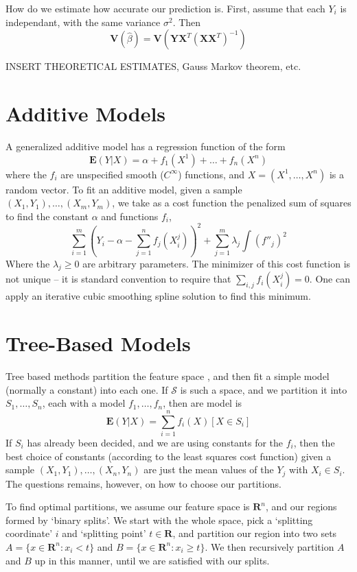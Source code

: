 How do we estimate how accurate our prediction is. First, assume that each $Y_i$ is independant, with the same variance $\sigma^2$. Then
%
\[ \mathbf{V}(\hat{\beta}) = \mathbf{V}(\mathbf{Y} \mathbf{X}^T (\mathbf{X} \mathbf{X}^T)^{-1}) \]

INSERT THEORETICAL ESTIMATES, Gauss Markov theorem, etc.





\section{Additive Models}

A generalized additive model has a regression function of the form
%
\[ \mathbf{E}(Y|X) = \alpha + f_1(X^1) + \dots + f_n(X^n) \]
%
where the $f_i$ are unspecified smooth ($C^\infty$) functions, and $X = (X^1, \dots, X^n)$ is a random vector. To fit an additive model, given a sample $(X_1, Y_1), \dots, (X_m, Y_m)$, we take as a cost function the penalized sum of squares to find the constant $\alpha$ and functions $f_i$,
%
\[ \sum_{i = 1}^m \left( Y_i - \alpha - \sum_{j = 1}^n f_j(X_i^j) \right)^2 + \sum_{j = 1}^m \lambda_j \int (f''_j)^2 \]
%
Where the $\lambda_j \geq 0$ are arbitrary parameters. The minimizer of this cost function is not unique -- it is standard convention to require that $\sum_{i,j} f_i(X_i^j) = 0$. One can apply an iterative cubic smoothing spline solution to find this minimum.

\section{Tree-Based Models}

Tree based methods partition the feature space , and then fit a simple model (normally a constant) into each one. If $\mathcal{S}$ is such a space, and we partition it into $S_1, \dots, S_n$, each with a model $f_1, \dots, f_n$, then are model is
%
\[ \mathbf{E}(Y|X) = \sum_{i = 1}^n f_i(X) [X \in S_i] \]
%
If $S_i$ has already been decided, and we are using constants for the $f_i$, then the best choice of constants (according to the least squares cost function) given a sample $(X_1, Y_1), \dots, (X_n, Y_n)$ are just the mean values of the $Y_j$ with $X_i \in S_i$. The questions remains, however, on how to choose our partitions.

To find optimal partitions, we assume our feature space is $\mathbf{R}^n$, and our regions formed by `binary splits'. We start with the whole space, pick a `splitting coordinate' $i$ and `splitting point' $t \in \mathbf{R}$, and partition our region into two sets $A = \{ x \in \mathbf{R}^n : x_i < t \}$ and $B = \{ x \in \mathbf{R}^n : x_i \geq t \}$. We then recursively partition $A$ and $B$ up in this manner, until we are satisfied with our splits.

